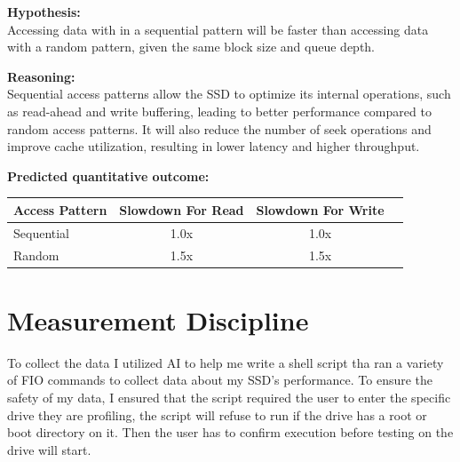 \documentclass[11pt]{article}
\begin{document}
\begin{hypothesisbox}
	\textbf{Hypothesis:} \\

	Accessing data with in a sequential pattern will be faster than accessing data with a random pattern, given the same
	block size and queue depth.

	\textbf{Reasoning:} \\

	Sequential access patterns allow the SSD to optimize its internal operations, such as read-ahead and write buffering,
	leading to better performance compared to random access patterns. It will also reduce the number of seek operations and
	improve cache utilization, resulting in lower latency and higher throughput.

	\textbf{Predicted quantitative outcome:} \\
	\begin{center}
		\label{tab:hypothesis-simd}
		\begin{tabular}{lccc}
			\toprule
			\textbf{Access Pattern} & \textbf{Slowdown For Read} & \textbf{ Slowdown For Write} \\
			\midrule
			Sequential              & 1.0x                       & 1.0x                         \\
			Random                  & 1.5x                       & 1.5x                         \\
			\bottomrule
		\end{tabular}
	\end{center}
\end{hypothesisbox}

\section{Measurement Discipline}

To collect the data I utilized AI to help me write a shell script tha ran a variety of FIO commands to collect data
about my SSD's performance. To ensure the safety of my data, I ensured that the script required the user to enter the
specific drive they are profiling, the script will refuse to run if the drive has a root or boot directory on it. Then
the user has to confirm execution before testing on the drive will start.
\end{document}
